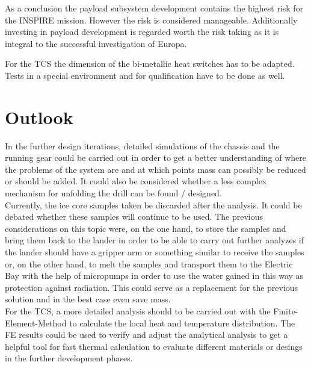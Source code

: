 As a conclusion the payload subsystem development contains the highest risk for the INSPIRE mission. However the risk is considered manageable. Additionally investing in payload development is regarded worth the risk taking as it is integral to the successful investigation of Europa.

For the TCS the dimension of the  bi-metallic heat switches has to be adapted.
Tests in a special environment and for qualification have to be done as well. 

\clearpage

\section{Outlook}
\label{sec:Outlook}

In the further design iterations, detailed simulations of the chassis and the running gear could be carried out in order to get a better understanding of where the problems of the system are and at which points mass can possibly be reduced or should be added. It could also be considered whether a less complex mechanism for unfolding the drill can be found / designed. \\

Currently, the ice core samples taken be discarded after the analysis. It could be debated whether these samples will continue to be used. The previous considerations on this topic were, on the one hand, to store the samples and bring them back to the lander in order to be able to carry out further analyzes if the lander should have a gripper arm or something similar to receive the samples or, on the other hand, to melt the samples and transport them to the Electric Bay with the help of micropumps in order to use the water gained in this way as protection against radiation. This could serve as a replacement for the previous solution and in the best case even save mass. \\

For the TCS, a more detailed analysis should to be carried out with the Finite-Element-Method to calculate the local heat and temperature distribution.
The FE results could be used to verify and adjust the analytical analysis to get a helpful tool for fast thermal calculation to evaluate different materials or desings in the further development phases.

